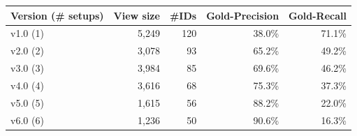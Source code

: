 \begin{tabular}{lrrrr}
\toprule
Version (\# setups) & View size & \#IDs & Gold-Precision & Gold-Recall \\
\midrule
v1.0 (1) & 5,249 & 120 & 38.0\% & 71.1\% \\
v2.0 (2) & 3,078 & 93 & 65.2\% & 49.2\% \\
v3.0 (3) & 3,984 & 85 & 69.6\% & 46.2\% \\
v4.0 (4) & 3,616 & 68 & 75.3\% & 37.3\% \\
v5.0 (5) & 1,615 & 56 & 88.2\% & 22.0\% \\
v6.0 (6) & 1,236 & 50 & 90.6\% & 16.3\% \\
\bottomrule
\end{tabular}
